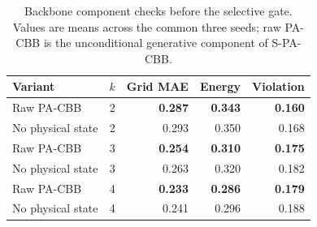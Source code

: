 \begin{table}[t]
\caption{Backbone component checks before the selective gate. Values are means across the common three seeds; raw PA-CBB is the unconditional generative component of S-PA-CBB.}
\label{tab:core_ablation}
\centering\scriptsize\setlength{\tabcolsep}{4pt}
\begin{tabular}{lrrrr}
\toprule
Variant & $k$ & Grid MAE & Energy & Violation \\
\midrule
Raw PA-CBB & 2 & \textbf{0.287} & \textbf{0.343} & \textbf{0.160} \\
No physical state & 2 & 0.293 & 0.350 & 0.168 \\
Raw PA-CBB & 3 & \textbf{0.254} & \textbf{0.310} & \textbf{0.175} \\
No physical state & 3 & 0.263 & 0.320 & 0.182 \\
Raw PA-CBB & 4 & \textbf{0.233} & \textbf{0.286} & \textbf{0.179} \\
No physical state & 4 & 0.241 & 0.296 & 0.188 \\
\bottomrule
\end{tabular}
\end{table}
